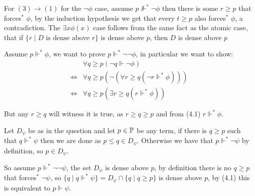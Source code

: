 \begin{cExercise}[][][author][4]
\begin{cPart}
		For $(3)\to(1)$ for the $\lnot\phi$ case, assume $p\not\Vdash^* \lnot\phi$ then there is some $r\ge p$ that forces$^*$ $\phi$, by the induction hypothesis we get that every $t\ge p$ also forces$^*$ $\phi$, a contradiction. The $\exists x\phi(x)$ case follows from the same fact as the atomic case, that if $\{r\mid D\text{ is dense above }r\}$ is dense above $p$, then $D$ is dense above $p$
	\end{cPart}
	\begin{cPart}
		Assume $p\Vdash^* \phi$, we want to prove $p\Vdash^*\lnot\lnot\phi$, in particular we want to show:
		\begin{align*}
			&\forall q\ge p (\lnot q\Vdash\lnot \phi)\\
			\iff&\forall q\ge p (\lnot (\forall r\ge q (\lnot r\Vdash^*\phi)))\\
			\iff&\forall q\ge p  (\exists r\ge q (r\Vdash^*\phi))
		\end{align*}
		
		But any $r\ge q$ will witness it is true, as $r\ge q\ge p$ and from (4.1) $r\Vdash^* \phi$.
	\end{cPart}
	\begin{cPart}
		Let $D_\psi$ be as in the question and let $p\in \Bbb P$ be any term, if there is $q\ge p$ such that $q\Vdash^* \psi$ then we are done as $p\le q\in D_\psi$.
		Otherwise we have that $p\Vdash^* \lnot\psi$ by definition, so $p\in D_\psi$.
		
		So assume $p\Vdash^*\lnot\lnot\psi$, the set $D_\psi$ is dense above $p$, by definition there is no $q\ge p$ that forces$^*$ $\lnot\psi$, so $\{q\mid q\Vdash^* \psi\}=D_\psi\cap \{q\mid q\ge p\}$ is dense above $p$, by (4.1) this is equivalent to $p\Vdash\psi$.
	\end{cPart}
\end{cExercise}
